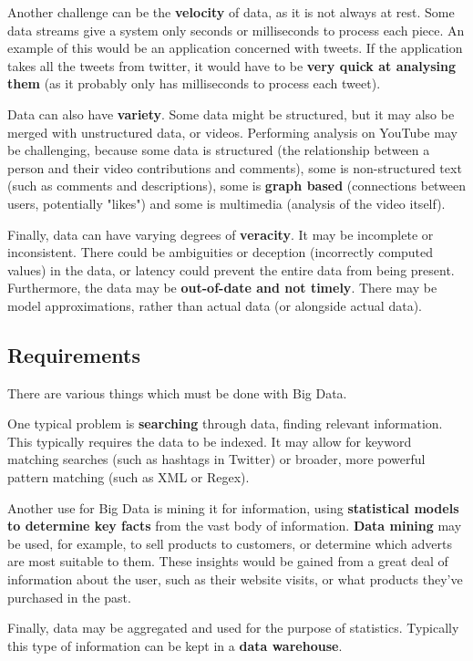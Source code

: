 \documentclass{article}
\begin{document}
Another challenge can be the \textbf{velocity} of data, as it is not always at rest. Some data streams give a system only seconds or milliseconds to process each piece. An example of this would be an application concerned with tweets. If the application takes all the tweets from twitter, it would have to be \textbf{very quick at analysing them} (as it probably only has milliseconds to process each tweet).

Data can also have \textbf{variety}. Some data might be structured, but it may also be merged with unstructured data, or videos. Performing analysis on YouTube may be challenging, because some data is structured (the relationship between a person and their video contributions and comments), some is non-structured text (such as comments and descriptions), some is \textbf{graph based} (connections between users, potentially "likes") and some is multimedia (analysis of the video itself). 

Finally, data can have varying degrees of \textbf{veracity}. It may be incomplete or inconsistent. There could be ambiguities or deception (incorrectly computed values) in the data, or latency could prevent the entire data from being present. Furthermore, the data may be \textbf{out-of-date and not timely}. There may be model approximations, rather than actual data (or alongside actual data). 

\subsection{Requirements}

There are various things which must be done with Big Data.

One typical problem is \textbf{searching} through data, finding relevant information. This typically requires the data to be indexed. It may allow for keyword matching searches (such as hashtags in Twitter) or broader, more powerful pattern matching (such as XML or Regex).

Another use for Big Data is mining it for information, using \textbf{statistical models to determine key facts} from the vast body of information. \textbf{Data mining} may be used, for example, to sell products to customers, or determine which adverts are most suitable to them. These insights would be gained from a great deal of information about the user, such as their website visits, or what products they've purchased in the past.

Finally, data may be aggregated and used for the purpose of statistics. Typically this type of information can be kept in a \textbf{data warehouse}.
\end{document}

